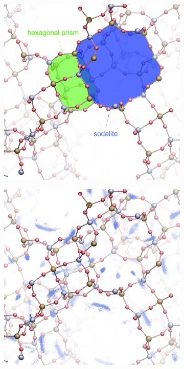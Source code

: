 \documentclass[main.tex]{subfiles}
\begin{document}
\begin{figure}
	\centering
	\begin{subfigure}{0.47\columnwidth}
		\centering
		\includegraphics[width=\columnwidth]{figures/cations/FAU1_cages_text.jpg}
		\label{fig:FAUdetail}
	\end{subfigure}\hfill%
	\begin{subfigure}{0.47\columnwidth}
		\centering
		\includegraphics[width=\columnwidth]{figures/cations/FAU1_density.jpg}
		\label{fig:FAUdensity}
	\end{subfigure}


\end{figure}
\end{document}
